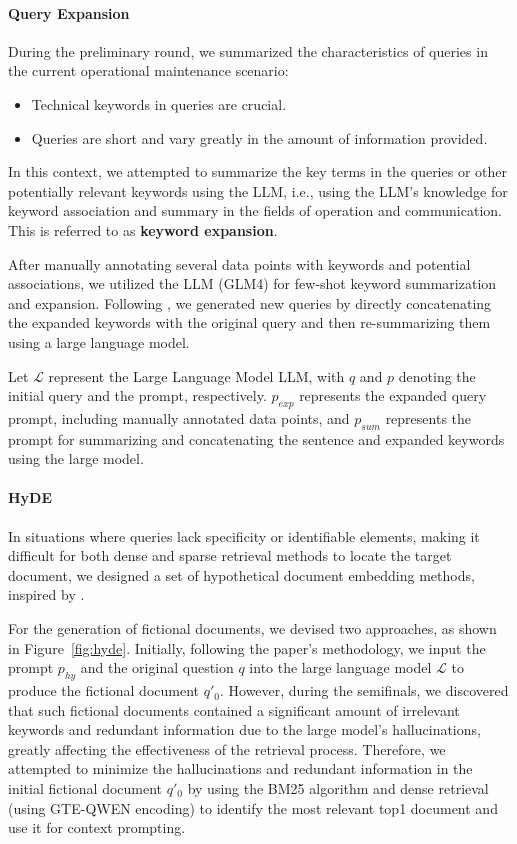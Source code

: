 \documentclass[11pt]{article}
\begin{document}
\paragraph{Query Expansion}
During the preliminary round, we summarized the characteristics of queries in the current operational maintenance scenario:
\begin{itemize}
    \item Technical keywords in queries are crucial.
    \item Queries are short and vary greatly in the amount of information provided.
\end{itemize}
In this context, we attempted to summarize the key terms in the queries or other potentially relevant keywords using the LLM, i.e., using the LLM's knowledge for keyword association and summary in the fields of operation and communication. This is referred to as \textbf{keyword expansion}.

After manually annotating several data points with keywords and potential associations, we utilized the LLM (GLM4) for few-shot keyword summarization and expansion. Following \citep{wang2023query2doc}, we generated new queries by directly concatenating the expanded keywords with the original query and then re-summarizing them using a large language model.

Let $\mathcal{L}$ represent the Large Language Model LLM, with $q$ and $p$ denoting the initial query and the prompt, respectively. $p_{exp}$ represents the expanded query prompt, including manually annotated data points, and $p_{sum}$ represents the prompt for summarizing and concatenating the sentence and expanded keywords using the large model.

\paragraph{HyDE} In situations where queries lack specificity or identifiable elements, making it difficult for both dense and sparse retrieval methods to locate the target document, we designed a set of hypothetical document embedding methods, inspired by \cite{gao2022precise}.

For the generation of fictional documents, we devised two approaches, as shown in Figure~\ref{fig:hyde}. Initially, following the paper's methodology, we input the prompt $p_{hy}$ and the original question $q$ into the large language model $\mathcal{L}$ to produce the fictional document $q'_0$. However, during the semifinals, we discovered that such fictional documents contained a significant amount of irrelevant keywords and redundant information due to the large model's hallucinations, greatly affecting the effectiveness of the retrieval process. Therefore, we attempted to minimize the hallucinations and redundant information in the initial fictional document $q'_0$ by using the BM25 algorithm and dense retrieval (using GTE-QWEN encoding) to identify the most relevant top1 document and use it for context prompting.
\end{document}

